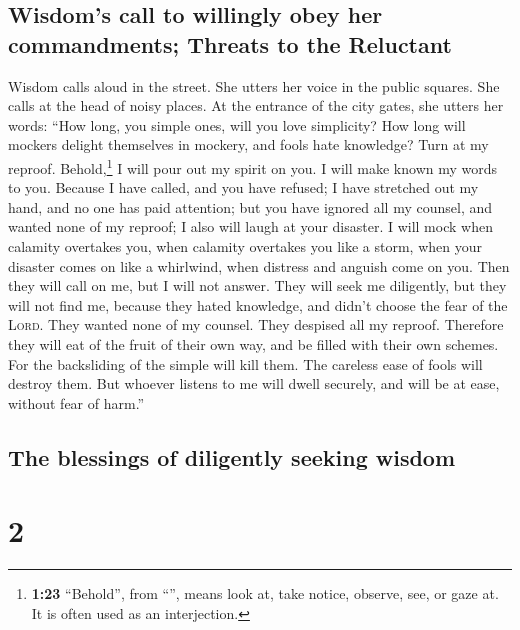 \hypertarget{wisdoms-call-to-willingly-obey-her-commandments-threats-to-the-reluctant}{%
\subsection{Wisdom's call to willingly obey her commandments; Threats to
the
Reluctant}\label{wisdoms-call-to-willingly-obey-her-commandments-threats-to-the-reluctant}}

 Wisdom calls aloud in the street. She utters her voice
in the public squares.  She calls at the head of noisy
places. At the entrance of the city gates, she utters her words:
 ``How long, you simple ones, will you love simplicity?
How long will mockers delight themselves in mockery, and fools hate
knowledge?  Turn at my reproof. Behold,\footnote{\textbf{1:23}
  ``Behold'', from ``'', means look at, take notice,
  observe, see, or gaze at. It is often used as an interjection.} I will
pour out my spirit on you. I will make known my words to you.
 Because I have called, and you have refused; I have
stretched out my hand, and no one has paid attention; 
but you have ignored all my counsel, and wanted none of my reproof;
 I also will laugh at your disaster. I will mock when
calamity overtakes you,  when calamity overtakes you like
a storm, when your disaster comes on like a whirlwind, when distress and
anguish come on you.  Then they will call on me, but I
will not answer. They will seek me diligently, but they will not find
me,  because they hated knowledge, and didn't choose the
fear of the \textsc{Lord}.  They wanted none of my
counsel. They despised all my reproof.  Therefore they
will eat of the fruit of their own way, and be filled with their own
schemes.  For the backsliding of the simple will kill
them. The careless ease of fools will destroy them.  But
whoever listens to me will dwell securely, and will be at ease, without
fear of harm.''

\hypertarget{the-blessings-of-diligently-seeking-wisdom}{%
\subsection{The blessings of diligently seeking
wisdom}\label{the-blessings-of-diligently-seeking-wisdom}}

\hypertarget{section-1}{%
\section{2}\label{section-1}}

